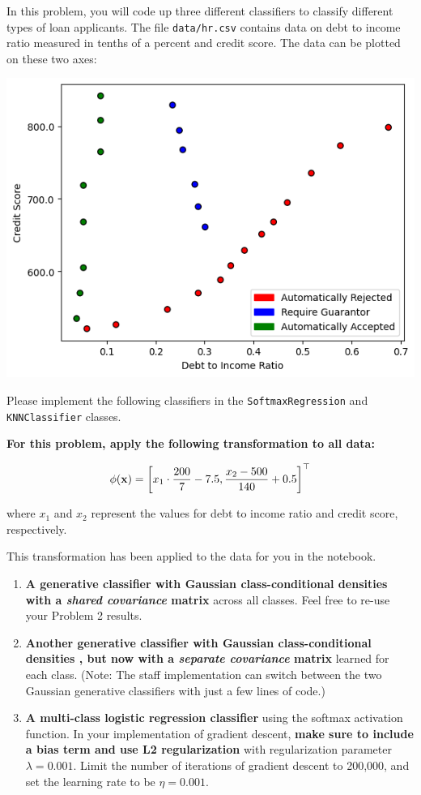 \documentclass[submit]{../harvardml}
\begin{document}
\begin{problem}
In this problem, you will code up three different classifiers to classify different types of loan applicants. The file \verb|data/hr.csv| contains data on debt to income ratio measured in tenths of a percent and credit score. The data can be plotted on these two axes:
\begin{center}
  \includegraphics[width=.5\textwidth]{img_input/credit.png}
\end{center}

Please implement the following classifiers in the \verb|SoftmaxRegression| and \verb|KNNClassifier| classes.

\textbf{For this problem, apply the following transformation to all data:}

$$\phi(\mathbf{x}) = \left[x_1 \cdot \frac{200}{7}-7.5, \frac{x_2-500}{140}+0.5\right]^\top$$

  where $x_1$ and $x_2$ represent the values for debt to income ratio and credit score, respectively.
  
  This transformation has been applied to the data for you in the notebook.

\begin{enumerate}[label=\alph*)]

  \item \textbf{A generative classifier with Gaussian class-conditional
          densities with a \textit{shared covariance} matrix} across all classes.
        Feel free to re-use your Problem 2 results.

  \item \textbf{Another generative classifier with Gaussian class-conditional densities , but now
          with a \textit{separate covariance} matrix} learned for each class. (Note:
        The staff implementation can switch between the two Gaussian generative classifiers with just a
        few lines of code.)

  \item \textbf{A multi-class logistic regression classifier} using the softmax activation function. In your implementation of gradient descent, \textbf{make sure to include a bias term and use L2 regularization} with regularization parameter $\lambda = 0.001$. Limit the number of iterations of gradient descent to 200,000, and set the learning rate to be $\eta = 0.001$.


\end{enumerate}
\end{problem}
\end{document}
